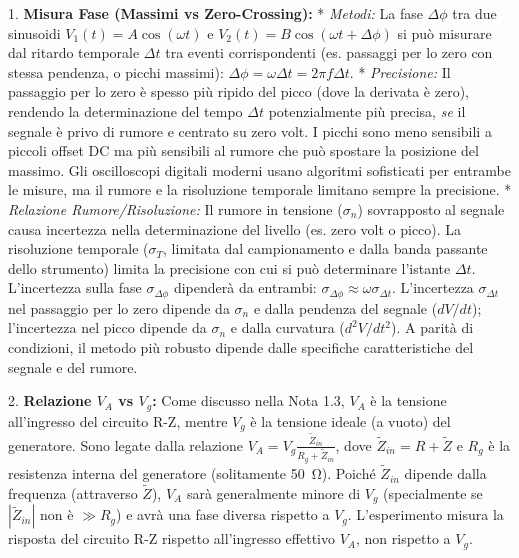 \documentclass[a4paper, 11pt]{article}
\newcommand{\abs}[1]{\left|#1\right|}
\begin{document}
1.  \textbf{Misura Fase (Massimi vs Zero-Crossing):}
    *   \textit{Metodi:} La fase $\Delta\phi$ tra due sinusoidi $V_1(t) = A\cos(\omega t)$ e $V_2(t) = B\cos(\omega t + \Delta\phi)$ si può misurare dal ritardo temporale $\Delta t$ tra eventi corrispondenti (es. passaggi per lo zero con stessa pendenza, o picchi massimi): $\Delta\phi = \omega \Delta t = 2\pi f \Delta t$.
    *   \textit{Precisione:} Il passaggio per lo zero è spesso più ripido del picco (dove la derivata è zero), rendendo la determinazione del tempo $\Delta t$ potenzialmente più precisa, \textit{se} il segnale è privo di rumore e centrato su zero volt. I picchi sono meno sensibili a piccoli offset DC ma più sensibili al rumore che può spostare la posizione del massimo. Gli oscilloscopi digitali moderni usano algoritmi sofisticati per entrambe le misure, ma il rumore e la risoluzione temporale limitano sempre la precisione.
    *   \textit{Relazione Rumore/Risoluzione:} Il rumore in tensione ($\sigma_n$) sovrapposto al segnale causa incertezza nella determinazione del livello (es. zero volt o picco). La risoluzione temporale ($\sigma_T$, limitata dal campionamento e dalla banda passante dello strumento) limita la precisione con cui si può determinare l'istante $\Delta t$. L'incertezza sulla fase $\sigma_{\Delta\phi}$ dipenderà da entrambi: $\sigma_{\Delta\phi} \approx \omega \sigma_{\Delta t}$. L'incertezza $\sigma_{\Delta t}$ nel passaggio per lo zero dipende da $\sigma_n$ e dalla pendenza del segnale ($dV/dt$); l'incertezza nel picco dipende da $\sigma_n$ e dalla curvatura ($d^2V/dt^2$). A parità di condizioni, il metodo più robusto dipende dalle specifiche caratteristiche del segnale e del rumore.

2.  \textbf{Relazione $V_A$ vs $V_g$:} Come discusso nella Nota 1.3, $V_A$ è la tensione all'ingresso del circuito R-Z, mentre $V_g$ è la tensione ideale (a vuoto) del generatore. Sono legate dalla relazione $V_A = V_g \frac{\tilde{Z}_{in}}{R_g + \tilde{Z}_{in}}$, dove $\tilde{Z}_{in} = R + \tilde{Z}$ e $R_g$ è la resistenza interna del generatore (solitamente \SI{50}{\ohm}). Poiché $\tilde{Z}_{in}$ dipende dalla frequenza (attraverso $\tilde{Z}$), $V_A$ sarà generalmente minore di $V_g$ (specialmente se $\abs{\tilde{Z}_{in}}$ non è $\gg R_g$) e avrà una fase diversa rispetto a $V_g$. L'esperimento misura la risposta del circuito R-Z rispetto all'ingresso effettivo $V_A$, non rispetto a $V_g$.
\end{document}
